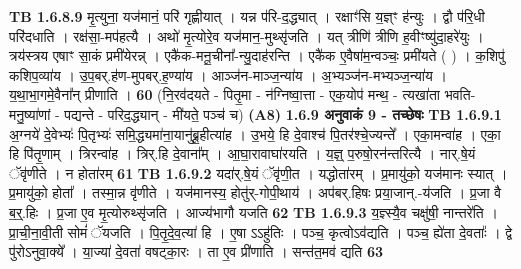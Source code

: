 \documentclass[17pt]{extarticle}
\begin{document}
                  \newline
                                \textbf{ TB 1.6.8.9} \newline
                  मृ॒त्युना॒ यज॑मानं॒ परि॑ गृह्णीयात् । यन्न प॑रि-द॒द्ध्यात् । रक्षाꣳ॑सि य॒ज्ञ्ꣳ ह॑न्युः । द्वौ प॑रि॒धी परि॑दधाति । रक्ष॑सा॒-मप॑हत्यै । अथो॑ मृ॒त्योरे॒व यज॑मान॒-मुथ्सृ॑जति । यत् त्रीणि॑ त्रीणि ह॒वीꣳष्यु॑दा॒हरे॑युः । त्रय॑स्त्रय एषाꣳ सा॒कं प्रमी॑येरन्न् । एकै॑क-मनू॒चीना᳚-न्यु॒दाह॑रन्ति । एकै॑क ए॒वैषा॑म॒न्वञ्चः॒ प्रमी॑यते ( ) । क॒शिपु॑ कशिप॒व्या॑य । उ॒प॒बर्.ह॑ण-मुपबर्.ह॒ण्या॑य । आञ्ज॑न-माञ्ज॒न्या॑य । अ॒भ्यञ्ज॑न-मभ्यञ्ज॒न्या॑य । य॒था॒भा॒गमे॒वैना᳚न् प्रीणाति । \textbf{ 60} \newline
                  \newline
                                    (नि॒रव॑दयते - पितृ॒मा - न॑ग्निष्वा॒त्ता - एक॒योप॑ मन्थ॒ - त्यखा॑ता भवति-मनु॒ष्या॑णां - पद्यन्ते - परिद॒द्ध्यान् - मी॑यते॒ पञ्च॑ च) \textbf{(A8)} \newline \newline
                \textbf{ 1.6.9     अनुवाकं   9 - तच्छेषः} \newline
                                \textbf{ TB 1.6.9.1} \newline
                  अ॒ग्नये॑ दे॒वेभ्यः॑ पि॒तृभ्यः॑ समि॒द्ध्यमा॑ना॒यानु॑ब्रू॒हीत्या॑ह । उ॒भये॒ हि दे॒वाश्च॑ पि॒तर॑श्चे॒ज्यन्ते᳚ । एका॒मन्वा॑ह । एका॒ हि पि॑तृ॒णाम् । त्रिरन्वा॑ह । त्रिर्.हि दे॒वाना᳚म् । आ॒घा॒रावाघा॑रयति । य॒ज्ञ्॒ प॒रुषो॒रन॑न्तरित्यै । नार्.षे॒यं ॅवृ॑णीते । न होता॑रम् \textbf{ 61} \newline
                  \newline
                                \textbf{ TB 1.6.9.2} \newline
                  यदा॑र्.षे॒यं ॅवृ॑णी॒त । यद्धोता॑रम् । प्र॒मायु॑को॒ यज॑मानः स्यात् । प्र॒मायु॑को॒ होता᳚ । तस्मा॒न्न वृ॑णीते । यज॑मानस्य॒ होतु॑र्-गोपी॒थाय॑ । अप॑बर्.हिषः प्रया॒जान्.-य॑जति । प्र॒जा वै ब॒र्॒.हिः । प्र॒जा ए॒व मृ॒त्योरुथ्सृ॑जति । आज्य॑भागौ यजति \textbf{ 62} \newline
                  \newline
                                \textbf{ TB 1.6.9.3} \newline
                  य॒ज्ञ्स्यै॒व चक्षु॑षी॒ नान्तरे॑ति । प्रा॒ची॒ना॒वी॒ती सोमं॑ ॅयजति । पि॒तृ॒दे॒व॒त्या॑ हि । ए॒षा ऽऽहु॑तिः । पञ्च॒ कृत्वोऽव॑द्यति । पञ्च॒ ह्ये॑ता दे॒वताः᳚ । द्वे पु॑रोऽनुवा॒क्ये᳚ । या॒ज्या॑ दे॒वता॑ वषट्का॒रः । ता ए॒व प्री॑णाति । सन्त॑त॒मव॑ द्यति \textbf{ 63} \newline
                  \newline
\end{document}
